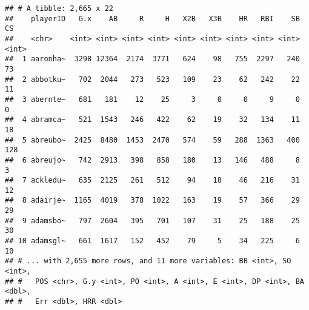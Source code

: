 \documentclass[]{book}
\newenvironment{Shaded}{\begin{snugshade}}{\end{snugshade}}
\newcommand{\KeywordTok}[1]{\textcolor[rgb]{0.13,0.29,0.53}{\textbf{#1}}}
\newcommand{\DecValTok}[1]{\textcolor[rgb]{0.00,0.00,0.81}{#1}}
\newcommand{\StringTok}[1]{\textcolor[rgb]{0.31,0.60,0.02}{#1}}
\newcommand{\OperatorTok}[1]{\textcolor[rgb]{0.81,0.36,0.00}{\textbf{#1}}}
\newcommand{\NormalTok}[1]{#1}
\begin{document}
\begin{Shaded}
\end{Shaded}

\begin{verbatim}
## # A tibble: 2,665 x 22
##    playerID   G.x    AB     R     H   X2B   X3B    HR   RBI    SB    CS
##    <chr>    <int> <int> <int> <int> <int> <int> <int> <int> <int> <int>
##  1 aaronha~  3298 12364  2174  3771   624    98   755  2297   240    73
##  2 abbotku~   702  2044   273   523   109    23    62   242    22    11
##  3 abernte~   681   181    12    25     3     0     0     9     0     0
##  4 abramca~   521  1543   246   422    62    19    32   134    11    18
##  5 abreubo~  2425  8480  1453  2470   574    59   288  1363   400   128
##  6 abreujo~   742  2913   398   858   180    13   146   488     8     3
##  7 ackledu~   635  2125   261   512    94    18    46   216    31    12
##  8 adairje~  1165  4019   378  1022   163    19    57   366    29    29
##  9 adamsbo~   797  2604   395   701   107    31    25   188    25    30
## 10 adamsgl~   661  1617   152   452    79     5    34   225     6    10
## # ... with 2,655 more rows, and 11 more variables: BB <int>, SO <int>,
## #   POS <chr>, G.y <int>, PO <int>, A <int>, E <int>, DP <int>, BA <dbl>,
## #   Err <dbl>, HRR <dbl>
\end{verbatim}

\begin{Shaded}
\end{Shaded}
\end{document}

